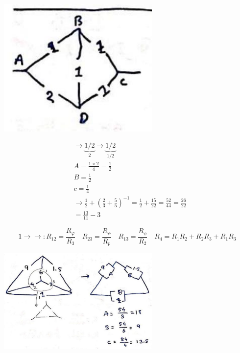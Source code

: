 \documentclass[12pt, a4paper]{article}
\newcommand{\figwidth}{8cm}
\begin{document}
\begin{center}
	\includegraphics[max width=\figwidth]{2024_06_15_f9b8f5fbbfa74e15de4eg-4}
\end{center}

$$
	\begin{aligned}
		 & \rightarrow \underbrace{1 / 2}_{2} \rightarrow \underbrace{1 / 2}_{1 / 2}                                               \\
		 & A=\frac{1 \times 2}{4}=\frac{1}{2}                                                                                      \\
		 & B=\frac{1}{2}                                                                                                           \\
		 & c=\frac{1}{4}                                                                                                           \\
		 & \rightarrow \frac{1}{2}+\left(\frac{2}{3}+\frac{5}{5}\right)^{-1}=\frac{1}{2}+\frac{15}{22}=\frac{52}{44}=\frac{26}{22} \\
		 & =\frac{13}{11}-3
	\end{aligned}
$$

$$
	1 \rightarrow \rightarrow: R_{12}=\frac{R_{\varphi}}{R_3} \quad R_{23}=\frac{R_{\psi}}{R_{p}} \quad R_{13}=\frac{R_{\psi}}{R_2} \quad R_4=R_1 R_2+R_2 R_3+R_1 R_3
$$

\begin{center}
	\includegraphics[max width=\figwidth]{2024_06_15_f9b8f5fbbfa74e15de4eg-5(3)}
\end{center}
\end{document}
